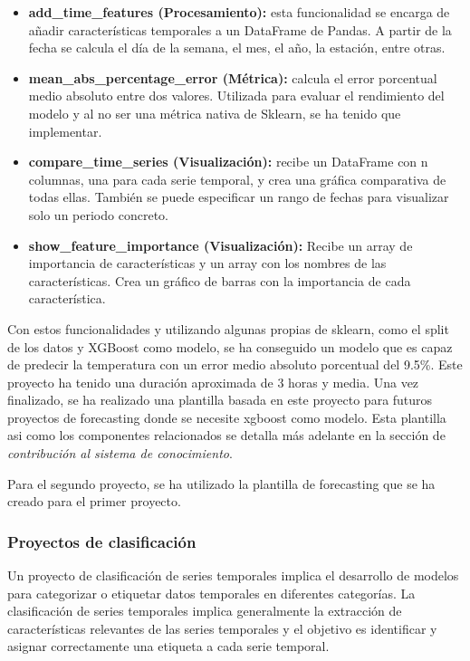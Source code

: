 \begin{itemize}
    \item \textbf{add\_time\_features (Procesamiento):} esta funcionalidad se encarga de añadir
    características temporales a un DataFrame de Pandas. A partir de la fecha se calcula
    el día de la semana, el mes, el año, la estación, entre otras.
    \item \textbf{mean\_abs\_percentage\_error (Métrica):} calcula el error porcentual medio
    absoluto entre dos valores. Utilizada para evaluar el rendimiento del modelo y al no
    ser una métrica nativa de Sklearn, se ha tenido que implementar.
    \item \textbf{compare\_time\_series (Visualización):} recibe un DataFrame con n columnas,
    una para cada serie temporal, y crea una gráfica comparativa de todas ellas. También
    se puede especificar un rango de fechas para visualizar solo un periodo concreto.
    \item \textbf{show\_feature\_importance (Visualización):} Recibe un array de importancia
    de características y un array con los nombres de las características. Crea un gráfico
    de barras con la importancia de cada característica.
\end{itemize}

Con estos funcionalidades y utilizando algunas propias de sklearn, como el split
de los datos y XGBoost como modelo, se ha conseguido un modelo que es capaz de predecir
la temperatura con un error medio absoluto porcentual del 9.5\%. Este proyecto ha tenido
una duración aproximada de 3 horas y media. Una vez finalizado, se ha realizado una
plantilla basada en este proyecto para futuros proyectos de forecasting donde se necesite
xgboost como modelo. Esta plantilla asi como los componentes relacionados se detalla más
adelante en la sección de \textit{contribución al sistema de conocimiento}.\medskip

Para el segundo proyecto, se ha utilizado la plantilla de forecasting que se ha creado
para el primer proyecto. 

\subsubsection{Proyectos de clasificación}
Un proyecto de clasificación de series temporales implica el desarrollo de modelos para 
categorizar o etiquetar datos temporales en diferentes categorías. La clasificación de 
series temporales implica generalmente la extracción de características relevantes 
de las series temporales y el objetivo es identificar y asignar correctamente una 
etiqueta a cada serie temporal.

